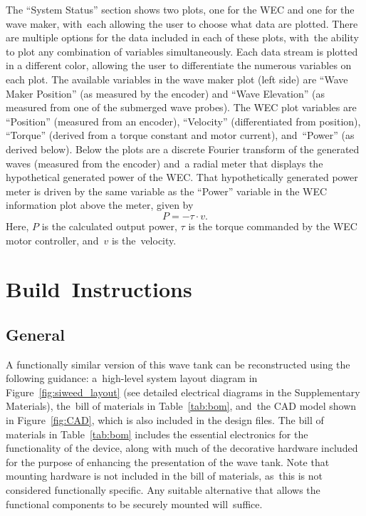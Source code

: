 \documentclass[hardware,article,submit,pdftex,moreauthors]{Definitions/mdpi}
\begin{document}
The ``System Status'' section shows two plots, one for the WEC and one for the wave maker, with~each allowing the user to choose what data are plotted. 
There are multiple options for the data included in each of these plots, with~the ability to plot any combination of variables simultaneously.
Each data stream is plotted in a different color, allowing the user to differentiate the numerous variables on each plot.
The available variables in the wave maker plot (left side) are ``Wave Maker Position'' (as measured by the encoder) and ``Wave Elevation'' (as measured from one of the submerged wave probes).
The WEC plot variables are ``Position'' (measured from an encoder), ``Velocity'' (differentiated from position), ``Torque'' (derived from a torque constant and motor current), and~``Power'' (as derived below).
Below the plots are a discrete Fourier transform of the generated waves (measured from the encoder) and~a radial meter that displays the hypothetical generated power of the WEC.
That hypothetically generated power meter is driven by the same variable as the ``Power'' variable in the WEC information plot above the meter, given by
\begin{equation}
  P = -\tau \cdot v .
\end{equation}
%
Here, %
$P$ is the calculated output power, $\tau$ is the torque commanded by the WEC motor controller, and~$v$ is the~velocity.



\section{Build~Instructions}


\subsection{General}
A functionally similar version of this wave tank can be reconstructed using the following guidance: a~high-level system layout diagram in Figure~\ref{fig:siweed_layout} (see detailed electrical diagrams in the Supplementary Materials), the~bill of materials in Table~\ref{tab:bom}, and~the CAD model shown in Figure~\ref{fig:CAD}, which is also included in the design files.
The bill of materials in Table~\ref{tab:bom} includes the essential electronics for the functionality of the device, along with much of the decorative hardware included for the purpose of enhancing the presentation of the wave tank.
Note that mounting hardware is not included in the bill of materials, as~this is not considered functionally specific.
Any suitable alternative that allows the functional components to be securely mounted will~suffice.
\end{document}
